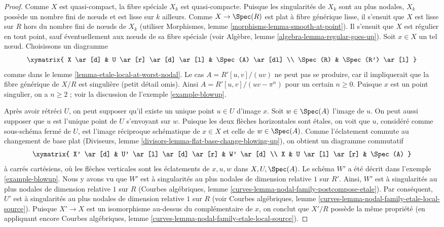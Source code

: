 \begin{proof}
Comme $X$ est quasi-compact, la fibre spéciale $X_k$ est quasi-compacte.
Puisque les singularités de $X_k$ sont au plus nodales, $X_k$ possède un nombre fini
de nœuds et est lisse sur $k$ ailleurs. Comme $X\to\Spec(R)$ est plat à
fibre générique lisse, il s'ensuit que $X$ est lisse sur $R$ hors du nombre
fini de nœuds de $X_k$ (utiliser Morphismes, lemme
\ref{morphisms-lemma-smooth-at-point}). Il s'ensuit que $X$ est régulier en
tout point, sauf éventuellement aux nœuds de sa fibre spéciale (voir
Algèbre, lemme \ref{algebra-lemma-regular-goes-up}). Soit $x\in X$ un tel
nœud. Choisissons un diagramme
$$
\xymatrix{
X \ar[d] &
U \ar[r] \ar[d] \ar[l] &
\Spec(A) \ar[dl] \\
\Spec(R) &
\Spec(R') \ar[l]
}
$$
comme dans le lemme \ref{lemma-etale-local-at-worst-nodal}.
Le cas $A=R'[u,v]/(uv)$ ne peut pas se produire, car il impliquerait que la
fibre générique de $X/R$ est singulière (petit détail omis). Ainsi
$A=R'[u,v]/(uv-\pi^n)$ pour un certain $n\geq0$. Puisque $x$ est un point
singulier, on a $n\geq2$ ; voir la discussion de l'exemple
\ref{example-blowup}.

\medskip\noindent
Après avoir rétréci $U$, on peut supposer qu'il existe un unique point
$u\in U$ d'image $x$. Soit $w\in\Spec(A)$ l'image de $u$. On peut aussi
supposer que $u$ est l'unique point de $U$ s'envoyant sur $w$. Puisque les
deux flèches horizontales sont étales, on voit que $u$, considéré comme
sous-schéma fermé de $U$, est l'image réciproque schématique de $x\in X$
et celle de $w\in\Spec(A)$. Comme l'éclatement commute au changement de
base plat (Diviseurs, lemme
\ref{divisors-lemma-flat-base-change-blowing-up}), on obtient un diagramme
commutatif
$$
\xymatrix{
X' \ar[d] &
U' \ar[l] \ar[d] \ar[r] &
W' \ar[d] \\
X & U \ar[l] \ar[r] & \Spec(A)
}
$$
à carrés cartésiens, où les flèches verticales sont les éclatements de
$x,u,w$ dans $X,U,\Spec(A)$. Le schéma $W'$ a été décrit dans l'exemple
\ref{example-blowup}. Nous y avons vu que $W'$ est à singularités au plus
nodales de dimension relative $1$ sur $R'$. Ainsi, $W'$ est à singularités
au plus nodales de dimension relative $1$ sur $R$ (Courbes algébriques, lemme
\ref{curves-lemma-nodal-family-postcompose-etale}). Par conséquent, $U'$ est
à singularités au plus nodales de dimension relative $1$ sur $R$ (voir
Courbes algébriques, lemme
\ref{curves-lemma-nodal-family-etale-local-source}). Puisque $X'\to X$ est
un isomorphisme au-dessus du complémentaire de $x$, on conclut que
$X'/R$ possède la même propriété (en appliquant encore Courbes algébriques,
lemme \ref{curves-lemma-nodal-family-etale-local-source}).


\end{proof}
